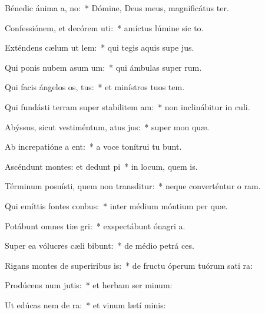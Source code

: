 \item Bénedic ánima a, no:~* Dómine, Deus meus, magnificátus  ter.
\item Confessiónem, et decórem uti:~* amíctus lúmine sic to.
\item Exténdens cælum ut lem:~* qui tegis aquis supe jus.
\item Qui ponis nubem asum um:~* qui ámbulas super  rum.
\item Qui facis ángelos os, tus:~* et minístros tuos  tem.
\item Qui fundásti terram super stabilitem am:~* non inclinábitur in  culi.
\item Abýssus, sicut vestiméntum, atus jus:~* super mon  quæ.
\item Ab increpatióne a ent:~* a voce tonítrui tu bunt.
\item Ascéndunt montes: et dedunt pi~* in locum, quem  is.
\item Términum posuísti, quem non transditur:~* neque converténtur o ram.
\item Qui emíttis fontes  conbus:~* inter médium móntium per quæ.
\item Potábunt omnes tiæ gri:~* exspectábunt ónagri   a.
\item Super ea vólucres cæli bibunt:~* de médio petrá  ces.
\item Rigans montes de superiribus is:~* de fructu óperum tuórum sati ra:
\item Prodúcens num jutis:~* et herbam ser minum:
\item Ut edúcas nem de ra:~* et vinum lætí  minis:
